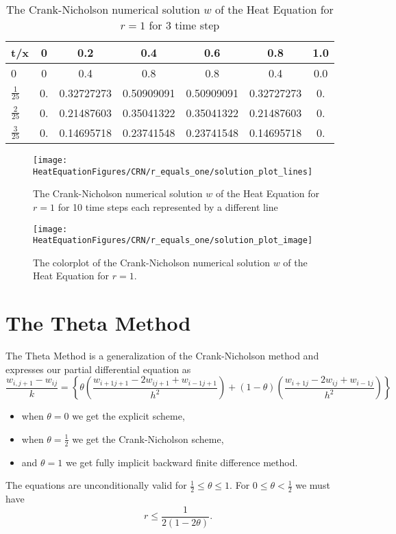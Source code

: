 \begin{example}
\begin{center}
\begin{table}[H]
 \caption{The Crank-Nicholson numerical solution $w$ of the Heat Equation for $r=1$ for 3 time step}
 \centering
\begin{tabular}{l|cccccc}
t/x&0&0.2&0.4&0.6&0.8&1.0\\ \hline
0&0&0.4&0.8&0.8&0.4&0.0\\
$\frac{1}{25}$&0.  &        0.32727273&  0.50909091 & 0.50909091&  0.32727273&  0.\\
$\frac{2}{25}$&0.      &    0.21487603 & 0.35041322 & 0.35041322&  0.21487603 & 0.\\

$\frac{3}{25}$&0.    &      0.14695718&  0.23741548  &0.23741548&  0.14695718&  0. 
\end{tabular}
\end{table}
\end{center}

\begin{figure}[H]
  \caption{The Crank-Nicholson numerical solution $w$ of the Heat Equation for $r=1$ for 10 time steps each represented by a different line}
  \centering
    \texttt{[image: HeatEquationFigures/CRN/r\_equals\_one/solution\_plot\_lines]}
\end{figure}


\begin{figure}[H]
  \caption{The colorplot of the Crank-Nicholson numerical solution $w$ of the Heat Equation for $r=1$.}
  \centering
    \texttt{[image: HeatEquationFigures/CRN/r\_equals\_one/solution\_plot\_image]}
\end{figure}

\end{example}




\section{The Theta Method}
The Theta Method is a generalization of the Crank-Nicholson method and expresses
our partial differential equation as
\begin{equation}
\label{2 theta}
\frac{w_{i,j+1}-w_{ij}}{k}=\left\{\theta\left(\frac{w_{i+1j+1}-2w_{ij+1}+w_{i-1j+1}}{h^2}\right)+
(1-\theta)\left(
\frac{w_{i+1j}-2w_{ij}+w_{i-1j}}{h^2}
\right)
\right\}
\end{equation}
\begin{itemize}
\item
when $\theta=0$ we get the explicit scheme,
\item
when $\theta=\frac{1}{2}$ we get the Crank-Nicholson scheme,
\item
and $\theta=1$ we get fully implicit backward finite difference method.
\end{itemize}
The equations are unconditionally valid for $\frac{1}{2}\leq \theta \leq 1$.
For  $0\leq \theta < \frac{1}{2}$ we must have
\[r\leq \frac{1}{2(1-2\theta)}. \]
